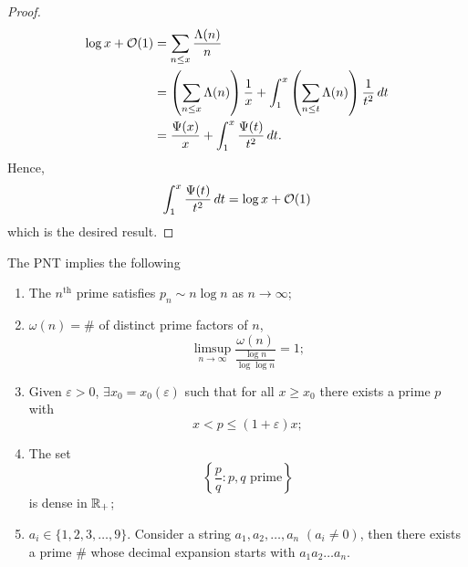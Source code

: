 \documentclass[twoside, openright, fontsize=10pt, headings=big]{scrbook}
\begin{document}
\begin{proof}
    \begin{align*}
        \log x+\mathcal{O}(1)&=\sum_{n\leq x}\frac{\Lambda(n)}{n}\\
        &=\left(\sum_{n\leq x}\Lambda(n)\right)\frac{1}{x}+\int_{1}^{x}\left(\sum_{n\leq t}\Lambda(n)\right)\frac{1}{t^2}\,dt\\
        &=\frac{\Psi(x)}{x}+\int_{1}^{x}\frac{\Psi(t)}{t^2}\,dt.
    \end{align*}
    Hence, 
    \[
        \int_{1}^{x}\frac{\Psi(t)}{t^2}\,dt=\log x+\mathcal{O}(1)
    \]
    which is the desired result.
\end{proof}

\begin{theorem}{}{}
    The PNT implies the following
    \begin{enumerate}
        \item[(1)] The $n^{\text{th}}$ prime satisfies $p_n\sim n\log n$ as $n\to\infty$;
        \item[(2)] $\omega(n)=\#$ of distinct prime factors of $n$,
        \[
            \limsup_{n\to\infty}\frac{\omega(n)}{\frac{\log n}{\log\log n}}=1;
        \]
        \item[(3)] Given $\varepsilon>0$, $\exists x_0=x_0(\varepsilon)$ such that for all $x\geq x_0$ there exists a prime $p$ with
        \[
            x<p\leq(1+\varepsilon)x;
        \]
        \item[(4)] The set 
        \[
            \left\{\frac{p}{q}:p,q\text{ prime}\right\}
        \]
        is dense in $\mathbb{R}_+$;
        \item[(5)] $a_i\in\{1,2,3,\dots,9\}$. Consider a string $a_1,a_2,\dots,a_n$ $(a_i\neq0)$, then there exists a prime $\#$ whose decimal expansion starts with $a_1a_2\dots a_n$.
    \end{enumerate}
\end{theorem}
\end{document}
